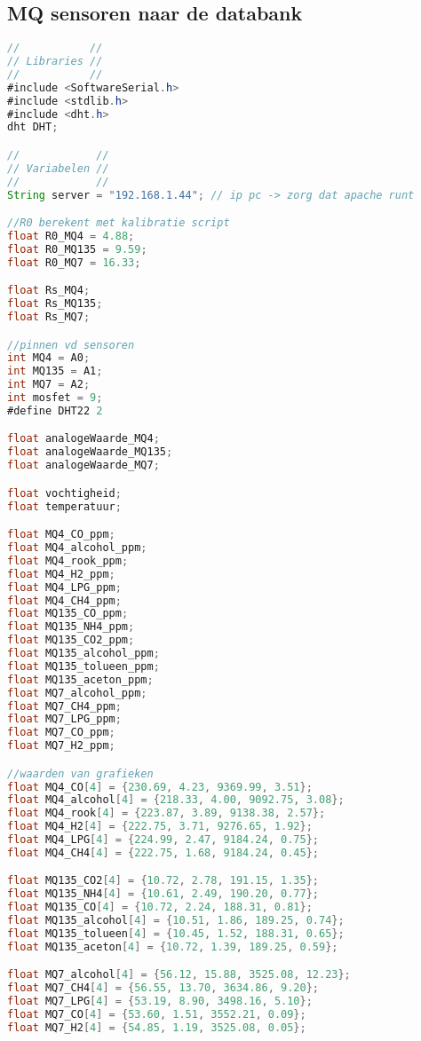 \subsection{MQ sensoren naar de databank}
\label{subsec:script_db}

\begin{lstlisting}[language=Java,caption={MQ sensoren naar de databank}]
//           //
// Libraries //
//           //
#include <SoftwareSerial.h>
#include <stdlib.h>
#include <dht.h>
dht DHT;

//            //
// Variabelen //
//            //
String server = "192.168.1.44"; // ip pc -> zorg dat apache runt

//R0 berekent met kalibratie script
float R0_MQ4 = 4.88;
float R0_MQ135 = 9.59;
float R0_MQ7 = 16.33;

float Rs_MQ4;
float Rs_MQ135;
float Rs_MQ7;

//pinnen vd sensoren 
int MQ4 = A0;
int MQ135 = A1;
int MQ7 = A2;
int mosfet = 9;
#define DHT22 2

float analogeWaarde_MQ4;
float analogeWaarde_MQ135;
float analogeWaarde_MQ7;

float vochtigheid;
float temperatuur;

float MQ4_CO_ppm;
float MQ4_alcohol_ppm;
float MQ4_rook_ppm;
float MQ4_H2_ppm;
float MQ4_LPG_ppm;
float MQ4_CH4_ppm;
float MQ135_CO_ppm;
float MQ135_NH4_ppm;
float MQ135_CO2_ppm;
float MQ135_alcohol_ppm;
float MQ135_tolueen_ppm;
float MQ135_aceton_ppm;
float MQ7_alcohol_ppm;
float MQ7_CH4_ppm;
float MQ7_LPG_ppm;
float MQ7_CO_ppm;
float MQ7_H2_ppm;

//waarden van grafieken
float MQ4_CO[4] = {230.69, 4.23, 9369.99, 3.51};
float MQ4_alcohol[4] = {218.33, 4.00, 9092.75, 3.08};
float MQ4_rook[4] = {223.87, 3.89, 9138.38, 2.57};
float MQ4_H2[4] = {222.75, 3.71, 9276.65, 1.92};
float MQ4_LPG[4] = {224.99, 2.47, 9184.24, 0.75};
float MQ4_CH4[4] = {222.75, 1.68, 9184.24, 0.45};

float MQ135_CO2[4] = {10.72, 2.78, 191.15, 1.35};
float MQ135_NH4[4] = {10.61, 2.49, 190.20, 0.77};
float MQ135_CO[4] = {10.72, 2.24, 188.31, 0.81};
float MQ135_alcohol[4] = {10.51, 1.86, 189.25, 0.74};
float MQ135_tolueen[4] = {10.45, 1.52, 188.31, 0.65};
float MQ135_aceton[4] = {10.72, 1.39, 189.25, 0.59};

float MQ7_alcohol[4] = {56.12, 15.88, 3525.08, 12.23};
float MQ7_CH4[4] = {56.55, 13.70, 3634.86, 9.20};
float MQ7_LPG[4] = {53.19, 8.90, 3498.16, 5.10};
float MQ7_CO[4] = {53.60, 1.51, 3552.21, 0.09};
float MQ7_H2[4] = {54.85, 1.19, 3525.08, 0.05};




\end{lstlisting}
